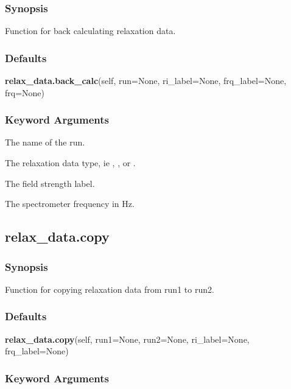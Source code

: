 \subsubsection{Synopsis}

Function for back calculating relaxation data.



\subsubsection{Defaults}

\textsf{\textbf{relax\_data.back\_calc}(self, run=None, ri\_label=None, frq\_label=None, frq=None)}


\subsubsection{Keyword Arguments}

  The name of the run. 

  The relaxation data type, ie , , or . 

  The field strength label. 

  The spectrometer frequency in Hz. 





\newpage

\subsection{relax\_data.copy}


\subsubsection{Synopsis}

Function for copying relaxation data from run1 to run2.



\subsubsection{Defaults}

\textsf{\textbf{relax\_data.copy}(self, run1=None, run2=None, ri\_label=None, frq\_label=None)}


\subsubsection{Keyword Arguments}

